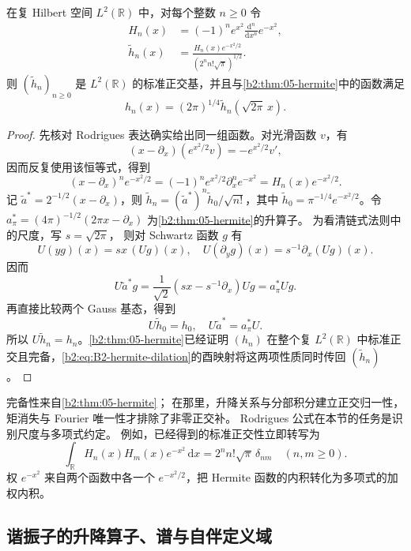 \begin{proposition}
\label{b2:prop:B2-hermite-basis}
在复 Hilbert 空间 \(L^2(\mathbb R)\) 中，对每个整数 \(n\ge0\) 令
\[
 \begin{aligned}
 H_n(x)&=(-1)^ne^{x^2}
 \frac{\mathrm d^n}{\mathrm dx^n}e^{-x^2},\\
 \widetilde h_n(x)&=
 \frac{H_n(x)e^{-x^2/2}}{(2^nn!\sqrt\pi)^{1/2}}.
 \end{aligned}
\]
则 \((\widetilde h_n)_{n\ge0}\) 是 \(L^2(\mathbb R)\) 的标准正交基，并且与\cref{b2:thm:05-hermite}中的函数满足
\[
 h_n(x)=(2\pi)^{1/4}\widetilde h_n(\sqrt{2\pi}\,x).
\]
\end{proposition}
\begin{proof}
先核对 Rodrigues 表达确实给出同一组函数。对光滑函数 \(v\)，有
\[
 (x-\partial_x)(e^{x^2/2}v)=-e^{x^2/2}v',
\]
因而反复使用该恒等式，得到
\[
 (x-\partial_x)^ne^{-x^2/2}
 =(-1)^ne^{x^2/2}\partial_x^ne^{-x^2}
 =H_n(x)e^{-x^2/2}.
\]
记 \(\widetilde a^*=2^{-1/2}(x-\partial_x)\)，则
\(\widetilde h_n=(\widetilde a^*)^n\widetilde h_0/\sqrt{n!}\)，其中
\(\widetilde h_0=\pi^{-1/4}e^{-x^2/2}\)。令
\(a_\pi^*=(4\pi)^{-1/2}(2\pi x-\partial_x)\) 为\cref{b2:thm:05-hermite}的升算子。
为看清链式法则中的尺度，写 \(s=\sqrt{2\pi}\)，
则对 Schwartz 函数 \(g\) 有
\[
 U(yg)(x)=sx\,(Ug)(x),\quad
 U(\partial_yg)(x)=s^{-1}\partial_x(Ug)(x).
\]
因而
\[
 U\widetilde a^*g
 =\frac1{\sqrt2}(sx-s^{-1}\partial_x)Ug
 =a_\pi^*Ug.
\]
再直接比较两个 Gauss 基态，得到
\[
 U\widetilde h_0=h_0,\quad U\widetilde a^*=a_\pi^*U.
\]
所以 \(U\widetilde h_n=h_n\)。\cref{b2:thm:05-hermite}已经证明 \((h_n)\) 在整个复 \(L^2(\mathbb R)\) 中标准正交且完备，\eqref{b2:eq:B2-hermite-dilation}的酉映射将这两项性质同时传回 \((\widetilde h_n)\)。
\end{proof}

完备性来自\cref{b2:thm:05-hermite}；
在那里，升降关系与分部积分建立正交归一性，矩消失与 Fourier 唯一性才排除了非零正交补。
Rodrigues 公式在本节的任务是识别尺度与多项式约定。
例如，已经得到的标准正交性立即转写为
\[
 \int_{\mathbb R}H_n(x)H_m(x)e^{-x^2}\,\mathrm dx
 =2^nn!\sqrt\pi\,\delta_{nm}\quad(n,m\geq0).
\]
权 \(e^{-x^2}\) 来自两个函数中各一个 \(e^{-x^2/2}\)，把 Hermite 函数的内积转化为多项式的加权内积。

\subsection{谐振子的升降算子、谱与自伴定义域}
\label{b2:subsec:B20102}

